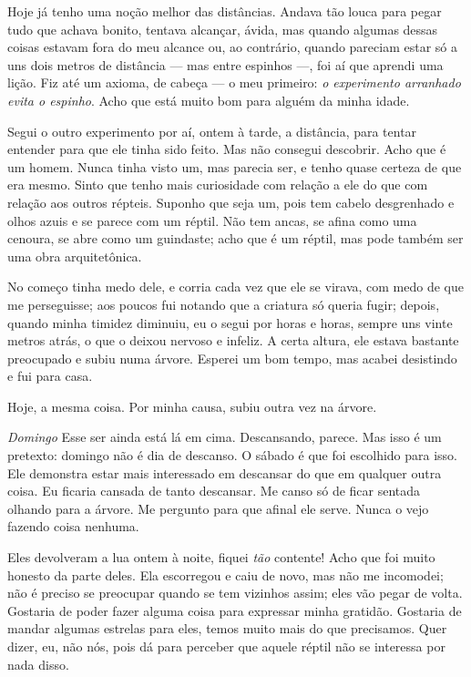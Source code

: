 Hoje já tenho uma noção melhor das distâncias. Andava tão louca para pegar
tudo que achava bonito, tentava alcançar, ávida, mas quando algumas
dessas coisas estavam fora do meu alcance ou, ao contrário, quando pareciam estar só a
uns dois metros de distância --- mas entre espinhos ---, foi aí que
aprendi uma lição. Fiz até um axioma, de cabeça --- o meu primeiro: \textit{o experimento
arranhado evita o espinho}. Acho que está muito bom para alguém da minha
idade.

Segui o outro experimento por aí, ontem à tarde, a distância, para tentar entender para que
ele tinha sido feito. Mas não consegui descobrir. Acho que é um
homem. Nunca tinha visto um, mas parecia ser, e tenho quase certeza de que
era mesmo. Sinto que tenho mais curiosidade com relação a ele do que
com relação aos outros répteis. Suponho que seja um, pois tem cabelo desgrenhado e
olhos azuis e se parece com um réptil. Não tem ancas, se afina como uma
cenoura, se abre como um guindaste; acho que é um réptil, mas
pode também ser uma obra arquitetônica.

No começo tinha medo dele, e corria cada vez que ele se virava, com medo de
que me perseguisse; aos poucos fui notando que a criatura só queria
fugir; depois, quando minha timidez diminuiu, eu o segui por horas e
horas, sempre uns vinte metros atrás, o que o deixou nervoso e infeliz.
A certa altura, ele estava bastante preocupado e subiu numa árvore. Esperei
um bom tempo, mas acabei desistindo e fui para casa.

Hoje, a mesma coisa. Por minha causa, subiu outra vez na árvore.

\textit{Domingo} Esse ser ainda está lá em cima. Descansando, parece. Mas isso é
um pretexto: domingo não é dia de descanso. O sábado é que foi escolhido
para isso. Ele demonstra estar mais interessado em
descansar do que em qualquer outra coisa. Eu ficaria cansada de tanto
descansar. Me canso só de ficar sentada olhando para a árvore. Me pergunto para
que afinal ele serve. Nunca o vejo fazendo coisa nenhuma.

Eles devolveram a lua ontem à noite, fiquei \textit{tão} contente! Acho que foi
muito honesto da parte deles. Ela escorregou e caiu de novo, mas não me
incomodei; não é preciso se preocupar quando se tem vizinhos
assim; eles vão pegar de volta. Gostaria de poder fazer alguma coisa para
expressar minha gratidão. Gostaria de mandar algumas estrelas para eles,
temos muito mais do que precisamos. Quer dizer, eu, não nós, pois dá para perceber que
aquele réptil não se interessa por nada disso.

